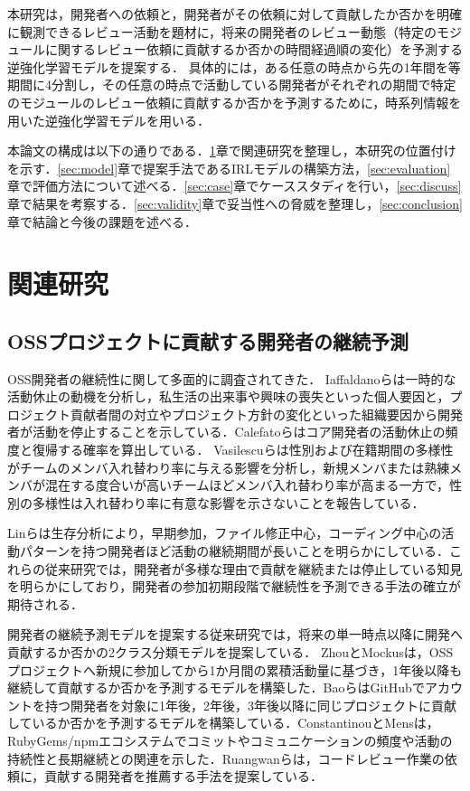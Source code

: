 \documentclass[submit]{ipsj}
\begin{document}
本研究は，開発者への依頼と，開発者がその依頼に対して貢献したか否かを明確に観測できるレビュー活動を題材に，将来の開発者のレビュー動態（特定のモジュールに関するレビュー依頼に貢献するか否かの時間経過順の変化）を予測する逆強化学習モデルを提案する． 具体的には，ある任意の時点から先の1年間を等期間に4分割し，その任意の時点で活動している開発者がそれぞれの期間で特定のモジュールのレビュー依頼に貢献するか否かを予測するために，時系列情報を用いた逆強化学習モデルを用いる．

本論文の構成は以下の通りである．\ref{sec:RelaatedWork}章で関連研究を整理し，本研究の位置付けを示す．\ref{sec:model}章で提案手法であるIRLモデルの構築方法，\ref{sec:evaluation}章で評価方法について述べる．\ref{sec:case}章でケーススタディを行い，\ref{sec:discuss}章で結果を考察する．\ref{sec:validity}章で妥当性への脅威を整理し，\ref{sec:conclusion}章で結論と今後の課題を述べる．

\section{関連研究}\label{sec:RelaatedWork}
\subsection{OSSプロジェクトに貢献する開発者の継続予測}
OSS開発者の継続性に関して多面的に調査されてきた．
Iaffaldanoらは一時的な活動休止の動機を分析し，私生活の出来事や興味の喪失といった個人要因と，プロジェクト貢献者間の対立やプロジェクト方針の変化といった組織要因から開発者が活動を停止することを示している\cite{iaffaldano}．Calefatoらはコア開発者の活動休止の頻度と復帰する確率を算出している\cite{calefato}．
Vasilescuらは性別および在籍期間の多様性がチームのメンバ入れ替わり率に与える影響を分析し，新規メンバまたは熟練メンバが混在する度合いが高いチームほどメンバ入れ替わり率が高まる一方で，性別の多様性は入れ替わり率に有意な影響を示さないことを報告している\cite{vasilescu}．

Linらは生存分析により，早期参加，ファイル修正中心，コーディング中心の活動パターンを持つ開発者ほど活動の継続期間が長いことを明らかにしている\cite{lin}．これらの従来研究では，開発者が多様な理由で貢献を継続または停止している知見を明らかにしており，開発者の参加初期段階で継続性を予測できる手法の確立が期待される．

開発者の継続予測モデルを提案する従来研究では，将来の単一時点以降に開発へ貢献するか否かの2クラス分類モデルを提案している．
ZhouとMockusは，OSSプロジェクトへ新規に参加してから1か月間の累積活動量に基づき，1年後以降も継続して貢献するか否かを予測するモデルを構築した\cite{zhou}．BaoらはGitHubでアカウントを持つ開発者を対象に1年後，2年後，3年後以降に同じプロジェクトに貢献しているか否かを予測するモデルを構築している\cite{bao}．ConstantinouとMensは，RubyGems/npmエコシステムでコミットやコミュニケーションの頻度や活動の持続性と長期継続との関連を示した\cite{constantinou}．Ruangwanらは，コードレビュー作業の依頼に，貢献する開発者を推薦する手法を提案している\cite{shade}．
\end{document}
